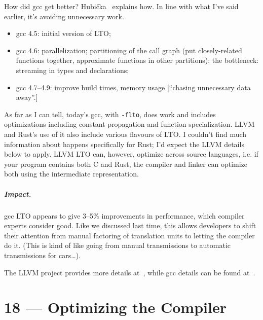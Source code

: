 \documentclass[a4paper]{report}
\begin{document}
How did gcc get better?
Hubi\v{c}ka~\cite{hubicka15:_link_gcc} explains how. In line with what I've said earlier, it's
avoiding unnecessary work.
\begin{itemize}[noitemsep]
\item gcc 4.5: initial version of LTO;
\item gcc 4.6: parallelization; partitioning of the call graph (put closely-related functions together, approximate functions in other partitions); the bottleneck: streaming in types and declarations;
\item gcc 4.7--4.9: improve build times, memory usage [``chasing unnecessary data away''.]
\end{itemize}
As far as I can tell, today's gcc, with {\tt -flto}, does work and includes
optimizations including constant propagation and function
specialization. LLVM and Rust's use of it also include various flavours of LTO.
I couldn't find much information about happens specifically for Rust; I'd expect the
LLVM details below to apply. LLVM LTO can, however,
optimize across source languages, i.e. if your program contains both C and Rust,
the compiler and linker can optimize both using the intermediate representation.

\paragraph{Impact.} gcc LTO appears to give 3--5\% improvements in performance, which compiler experts consider good.
Like we discussed last time, this allows developers to shift their attention from 
manual factoring of translation units to letting the compiler do it. (This is kind of like going
from manual transmissions to automatic transmissions for cars\ldots).

The LLVM project provides more details at~\cite{project17:_llvm_link_time_optim}, while gcc details
can be found at~\cite{novillo09:_linkt}.










\chapter*{18 --- Optimizing the Compiler}

\end{document}
